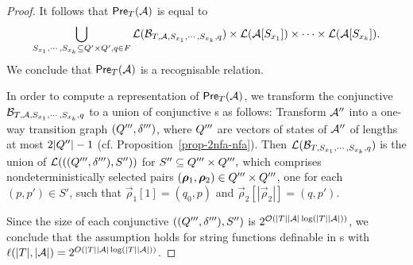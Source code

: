 \begin{proof}
It follows that $\textsf{Pre}_{T}(\mathcal{A})$ is equal to 
\[
\bigcup_{S_{x_1}, \cdots, S_{x_k} \subseteq Q' \times Q', q\in F} \mathcal{L}(\mathcal{B}_{T, \mathcal{A}, S_{x_1}, \cdots, S_{x_k},q}) \times \mathcal{L}(\mathcal{A}[S_{x_1}]) \times \cdots  \times \mathcal{L}(\mathcal{A}[S_{x_k}]).\]
%
We conclude that $\textsf{Pre}_{T}(\mathcal{A})$ is a recognisable relation. 

In order to compute a representation of $\textsf{Pre}_{T}(\mathcal{A})$, we transform the conjunctive \FFA{} $\mathcal{B}_{T, \mathcal{A}, S_{x_1}, \cdots, S_{x_k},q}$ to a union of conjunctive \FA{}s as follows: Transform $\mathcal{A}''$ into a one-way transition graph $(Q''',\delta''')$, where $Q'''$ are vectors of states of $\mathcal{A}''$ of lengths at most $2|Q''|-1$ (cf. Proposition~\ref{prop-2nfa-nfa}). Then $\mathcal{L}(\mathcal{B}_{T, S_{x_1}, \cdots, S_{x_k},q})$ is the union of $\mathcal{L}(((Q''',\delta'''), S''))$ for $S'' \subseteq Q''' \times Q''',$ which comprises nondeterministically selected pairs $(\vec{\rho}_1, \vec{\rho}_2) \in \controls''' \times \controls'''$, one for each $(p, p') \in S'$, such that $\vec{\rho}_1[1] =(q_0, p)$ and  $\vec{\rho}_2[|\vec{\rho}_2|] = (q, p')$.

Since the size of each conjunctive \FA{} $((Q''',\delta'''), S'')$ is $ 2^{\mathcal{O}(|T||\mathcal{A}|\log (|T||\mathcal{A}|))}$, we conclude that 
the \prerec{} assumption holds for string functions definable in \PPT{}s with $\ell(|T|, |\mathcal{A}|) = 2^{O(|T||\mathcal{A}|\log (|T||\mathcal{A}|))}$.
\end{proof}

